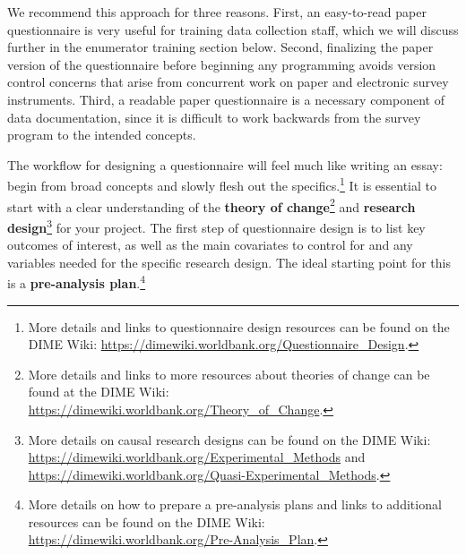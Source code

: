 \documentclass[
]{book}
\begin{document}
We recommend this approach for three reasons.
First, an easy-to-read paper questionnaire
is very useful for training data collection staff,
which we will discuss further in the enumerator training section below.
Second, finalizing the paper version of the questionnaire before beginning any programming
avoids version control concerns that arise from concurrent work
on paper and electronic survey instruments.
Third, a readable paper questionnaire is a necessary component of data documentation,
since it is difficult to work backwards from the survey program to the intended concepts.

The workflow for designing a questionnaire will feel much like writing an essay:
begin from broad concepts and slowly flesh out the specifics.\footnote{More details
  and links to questionnaire design resources can be found on the DIME Wiki:
  \url{https://dimewiki.worldbank.org/Questionnaire_Design}.}
It is essential to start with a clear understanding of the
\textbf{theory of change}\footnote{More details and links to more resources about theories of change
  can be found at the DIME Wiki:
  \url{https://dimewiki.worldbank.org/Theory_of_Change}.}
and \textbf{research design}\footnote{More details on causal research designs can be found on the DIME Wiki:
  \url{https://dimewiki.worldbank.org/Experimental_Methods}
  and \url{https://dimewiki.worldbank.org/Quasi-Experimental_Methods}.}
for your project.
The first step of questionnaire design is to list key outcomes of interest,
as well as the main covariates to control for and any variables needed for the specific research design.
The ideal starting point for this is a \textbf{pre-analysis plan}.\footnote{More details on how to prepare a pre-analysis plans
  and links to additional resources
  can be found on the DIME Wiki:
  \url{https://dimewiki.worldbank.org/Pre-Analysis_Plan}.}
\end{document}
